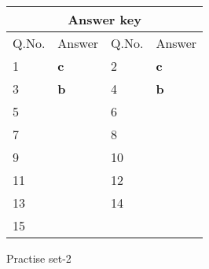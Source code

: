 \begin{table}[H]
	\centering
	\begin{tabular}{|p{1.5cm}|p{1.5cm}||p{1.5cm}|p{1.5cm}|}
		\hline
		\multicolumn{4}{|c|}{\textbf{Answer key}}\\\hline\hline
		\rowcolor{ocrel}Q.No.&Answer&Q.No.&Answer\\\hline
		1&\textbf{c} &2&\textbf{c}\\\hline 
		3&\textbf{b} &4&\textbf{b} \\\hline
		5&\textbf{} &6&\textbf{} \\\hline
		7&\textbf{}&8&\textbf{}\\\hline
		9&\textbf{}&10&\textbf{}\\\hline
		11&\textbf{} &12&\textbf{}\\\hline
		13&\textbf{}&14&\textbf{}\\\hline
		15&\textbf{}& &\\\hline
		
	\end{tabular}
\end{table}
\newpage
\begin{abox}
	Practise set-2
\end{abox}
